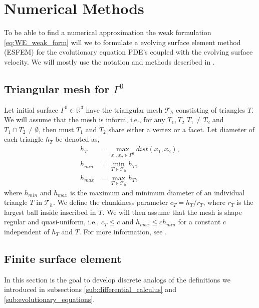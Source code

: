 
\section{Numerical Methods}%
\label{sec:numerical_methods}


 To be able to find a numerical approximation the weak formulation \eqref{eq:WE_weak_form} will we to formulate a evolving surface element method (ESFEM) for the evolutionary equation PDE's coupled with the evolving surface velocity. We will mostly
 use the notation and methods described in \cite{kovacs2021convergent, hu2022evolving}.

\subsection{ Triangular mesh for $\Gamma ^{0}$  }%
\label{sub:triangular_mesh}

Let initial surface $\Gamma ^{0} \in  \mathbb{R} ^3$ have the triangular mesh $\mathcal{T}_{h} $ constisting of triangles $T$. We will assume that the mesh is inform, i.e., for any $T_{1}, T_{2}$ $T_{1} \neq T_{2}$ and $T_{1} \cap T_{2} \neq \emptyset
$, then must $T_{1}$  and $T_{2}$ share either a vertex or a facet. Let diameter of each triangle $h_{T}$  be denoted as,
\[
    \begin{split}
    h_{T} & = \max_{x_{1}, x_{2} \in \Gamma ^{0}} dist(x_{1}, x_{2}), \\
h_{min} & = \min_{T \in \mathcal{T} _{h}} h_{T}, \\
h_{max} & = \max_{T \in \mathcal{T} _{h}} h_{T},
    \end{split}
\]
where $h_{min}$ and $h_{max}$ is the maximum and minimum diameter of an individual triangle $T$ in $\mathcal{T}_{h} $. We define the chunkiness parameter $c_{T} = h_{T}/r_{T}$, where $r_{T}$ is the largest ball inside inscribed in $T$. We will then
assume that the mesh is shape regular and quasi-uniform, i.e., $c_{T} \le c $ and $h_{max} \le c h_{min} $ for a  constant $c$ independent of $h_{T} $ and $T$.
For more information, see \cite{dziuk2007finite}.

\subsection{Finite surface element}%
\label{sub:surface_element_method}
In this section is the goal to develop discrete analogs of the definitions we introduced in subsections \ref{sub:differential_calculus} and \ref{sub:evolutionary_equations}.


